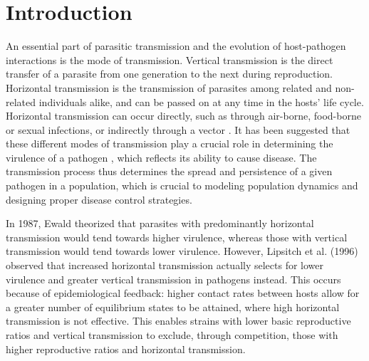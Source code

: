 \section{Introduction}
An essential part of parasitic transmission and the evolution of host-pathogen
interactions is the mode of transmission.
Vertical transmission is the direct transfer of a parasite from one generation
to the next during reproduction.
Horizontal transmission is the transmission of parasites among related and
non-related individuals alike, and can be passed on at any time in the hosts’
life cycle\supercite{Ebert:2013}.
Horizontal transmission can occur directly, such as through air-borne,
food-borne or sexual infections, or indirectly through a vector
\supercite{CHEN2006}.
It has been suggested that these different modes of transmission play a crucial
role in determining the virulence of a pathogen
\supercite{Clayton:1994,EWALD:2011}, which reflects its ability to cause
disease\supercite{PAYNE2017}.
The transmission process thus determines the spread and persistence of a given
pathogen in a population, which is crucial to modeling population dynamics and
designing proper disease control strategies.

In 1987, Ewald\supercite{Ewald:1987} theorized that parasites with predominantly
horizontal transmission would tend towards higher virulence, whereas those with
vertical transmission would tend towards lower virulence.
However, Lipsitch et al. (1996)\supercite{Lipsitch:1996} observed that increased
horizontal transmission actually selects for lower virulence and greater vertical
transmission in pathogens instead.
This occurs because of epidemiological feedback: higher contact rates between
hosts allow for a greater number of equilibrium states to be attained, where
high horizontal transmission is not effective\supercite{Lipsitch:1995}.
This enables strains with lower basic reproductive ratios and vertical
transmission to exclude, through competition, those with higher reproductive
ratios and horizontal transmission.

